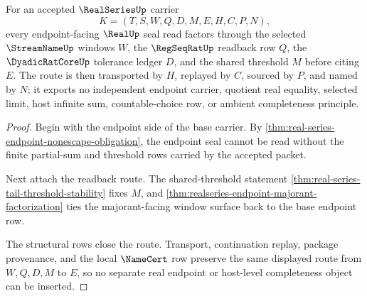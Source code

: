 \begin{theorem}
\label{thm:realseries-regseqrat-endpoint-seal-route}
For an accepted $\RealSeriesUp$ carrier
$$
K=(T,S,W,Q,D,M,E,H,C,P,N),
$$
every endpoint-facing $\RealUp$ seal read factors through the selected $\StreamNameUp$ windows $W$, the $\RegSeqRatUp$ readback row $Q$, the $\DyadicRatCoreUp$ tolerance ledger $D$, and the shared threshold $M$ before citing $E$. The route is then transported by $H$, replayed by $C$, sourced by $P$, and named by $N$; it exports no independent endpoint carrier, quotient real equality, selected limit, host infinite sum, countable-choice row, or ambient completeness principle.
\end{theorem}
\begin{proof}
Begin with the endpoint side of the base carrier. By \autoref{thm:real-series-endpoint-nonescape-obligation}, the endpoint seal cannot be read without the finite partial-sum and threshold rows carried by the accepted packet.

Next attach the readback route. The shared-threshold statement \autoref{thm:real-series-tail-threshold-stability} fixes $M$, and \autoref{thm:realseries-endpoint-majorant-factorization} ties the majorant-facing window surface back to the base endpoint row.

The structural rows close the route. Transport, continuation replay, package provenance, and the local $\NameCert$ row preserve the same displayed route from $W,Q,D,M$ to $E$, so no separate real endpoint or host-level completeness object can be inserted.
\end{proof}

